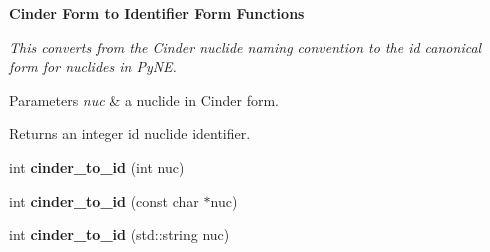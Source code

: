 \begin{Indent}{\bf Cinder Form to Identifier Form Functions}\par
{\em This converts from the Cinder nuclide naming convention to the id canonical form for nuclides in Py\+NE. 
\begin{DoxyParams}{Parameters}
{\em nuc} & a nuclide in Cinder form. \\
\hline
\end{DoxyParams}
\begin{DoxyReturn}{Returns}
an integer id nuclide identifier. 
\end{DoxyReturn}
}\begin{DoxyCompactItemize}
\item 
int {\bfseries cinder\+\_\+to\+\_\+id} (int nuc)\hypertarget{namespacepyne_1_1nucname_a5c016b1b66515eb8050137ac45afdfd0}{}\label{namespacepyne_1_1nucname_a5c016b1b66515eb8050137ac45afdfd0}

\item 
int {\bfseries cinder\+\_\+to\+\_\+id} (const char $\ast$nuc)\hypertarget{namespacepyne_1_1nucname_a5b3cbddb3ab00d191b4a0c23603d34f1}{}\label{namespacepyne_1_1nucname_a5b3cbddb3ab00d191b4a0c23603d34f1}

\item 
int {\bfseries cinder\+\_\+to\+\_\+id} (std\+::string nuc)\hypertarget{namespacepyne_1_1nucname_a72bc35fb19b1cfd3dc8a11d9a8963d4a}{}\label{namespacepyne_1_1nucname_a72bc35fb19b1cfd3dc8a11d9a8963d4a}

\end{DoxyCompactItemize}
\end{Indent}

